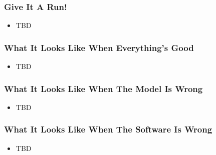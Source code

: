 \begin{frame}
  \frametitle{Give It A Run!}
  \begin{itemize}
    \item TBD
  \end{itemize}
\end{frame}

\begin{frame}
  \frametitle{What It Looks Like When Everything's Good}
  \begin{itemize}
    \item TBD
  \end{itemize}
\end{frame}

\begin{frame}
  \frametitle{What It Looks Like When The Model Is Wrong}
  \begin{itemize}
    \item TBD
  \end{itemize}
\end{frame}

\begin{frame}
  \frametitle{What It Looks Like When The Software Is Wrong}
  \begin{itemize}
    \item TBD
  \end{itemize}
\end{frame}
